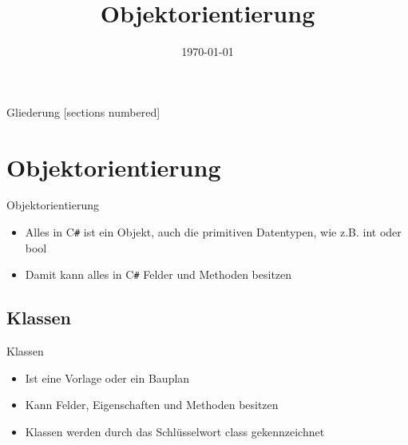 



\title{Objektorientierung}
\date{\today}




\maketitle

\begin{frame}{Gliederung}
	[sections numbered]
	\tableofcontents
\end{frame}

\section{Objektorientierung}
\begin{frame}{Objektorientierung}
	\begin{itemize}
		\item Alles in C\texttt{\#} ist ein Objekt, auch die primitiven Datentypen, wie z.B. int oder bool
		\item Damit kann alles in C\texttt{\#} Felder und Methoden besitzen		
	\end{itemize}
\end{frame}

\subsection{Klassen}
\begin{frame}{Klassen}
	\begin{itemize}
		\item Ist eine Vorlage oder ein Bauplan
		\item Kann Felder, Eigenschaften und Methoden besitzen
		\item Klassen werden durch das Schlüsselwort \alert{class} gekennzeichnet
	\end{itemize}	
	
\end{frame}

